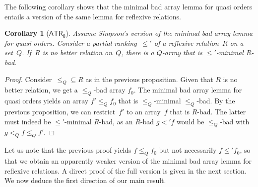 \documentclass{amsart}
\numberwithin{theorem}{section}
\newtheorem{corollary}[theorem]{Corollary}
\theoremstyle{definition}
\begin{document}
The following corollary shows that the minimal bad array lemma for quasi orders entails a version of the same lemma for reflexive relations.

\begin{corollary}[$\mathsf{ATR_0}$]
Assume Simpson's version of the minimal bad array lemma for quasi orders. Consider a partial ranking~$\leq'$ of a reflexive relation~$R$ on a set~$Q$. If~$R$ is no better relation on~$Q$, there is a $Q$-array that is $\leq'$-minimal $R$-bad.
\end{corollary}
\begin{proof}
Consider~${\leq_Q}\subseteq R$ as in the previous proposition. Given that $R$ is no better relation, we get a $\leq_Q$-bad array $f_0$. The minimal bad array lemma for quasi orders yields an array $f'\leq_Q f_0$ that is $\leq_Q$-minimal $\leq_Q$-bad. By the previous proposition, we can restrict~$f'$ to an array~$f$ that is $R$-bad. The latter must indeed be $\leq'$-minimal $R$-bad, as an $R$-bad $g<'f$ would be $\leq_Q$-bad with $g<_Q f\leq_Q f'$.
\end{proof}

Let us note that the previous proof yields $f\leq_Q f_0$ but not necessarily $f\leq' f_0$, so that we obtain an apparently weaker version of the minimal bad array lemma for reflexive relations. A direct proof of the full version is given in the next section. We now deduce the first direction of our main result.
\end{document}
